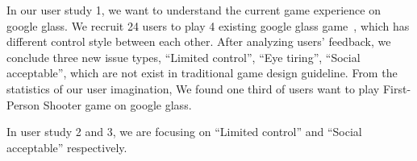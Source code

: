 In our user study 1, we want to understand the current game experience on google glass. We recruit 24 users to play 4 existing google glass game~\cite{minigame}, which has different control style between each other. After analyzing users' feedback, we conclude three new issue types, ``Limited control'', ``Eye tiring'', ``Social acceptable'', which are not exist in traditional game design guideline. From the statistics of our user imagination, We found one third of users want to play First-Person Shooter game on google glass.

In user study 2 and 3, we are focusing on ``Limited control'' and ``Social acceptable'' respectively.





